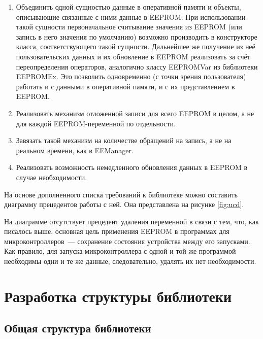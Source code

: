 \begin{enumerate}
	\item Объединить одной сущностью данные в оперативной памяти и объекты, описывающие связанные с ними данные в EEPROM.
	При использовании такой сущности первоначальное считывание значения из EEPROM (или запись в него значения по умолчанию) возможно производить в конструкторе класса, соответствующего такой сущности.
	Дальнейшее же получение из неё пользовательских данных и их обновление в EEPROM реализовать за счёт переопределения операторов, аналогично классу EEPROMVar из библиотеки EEPROMEx.
	Это позволить одновременно (с точки зрения пользователя) работать и с данными в оперативной памяти, и с их представлением в EEPROM.
	\item Реализовать механизм отложенной записи для всего EEPROM в целом, а не для каждой EEPROM-переменной по отдельности.
	\item Завязать такой механизм на количестве обращений на запись, а не на реальном времени, как в EEManager.
	\item Реализовать возможность немедленного обновления данных в EEPROM в случае необходимости.
\end{enumerate}

На основе дополненного списка требований к библиотеке можно составить диаграмму прецедентов работы с ней. Она представлена на рисунке \ref{fig:ucd}.


На диаграмме отсутствует прецедент удаления переменной в связи с тем, что, как писалось выше, основная цель применения EEPROM в программах для  микроконтроллеров~--- сохранение состояния устройства между его запусками.
Как правило, для запуска микроконтроллера с одной и той же программой необходимы одни и те же данные, следовательно, удалять их нет необходимости.

\section{Разработка структуры библиотеки}

\subsection{Общая структура библиотеки} \label{subsection:library-structure}

